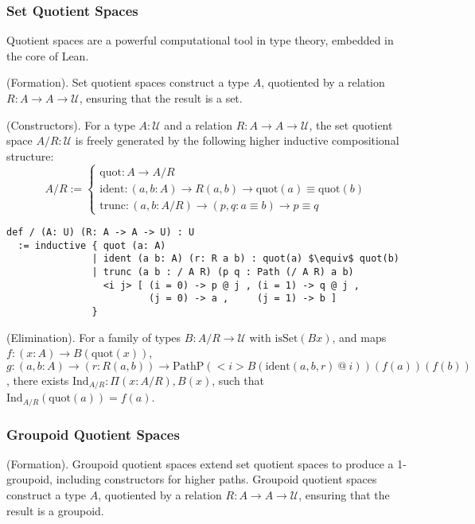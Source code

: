 \subsubsection*{Set Quotient Spaces}
Quotient spaces are a powerful computational tool in type theory, embedded
in the core of Lean.
\begin{definition} (Formation).
Set quotient spaces construct a type \( A \), quotiented by
a relation \( R : A \to A \to \mathcal{U} \), ensuring that the result is a set.
\end{definition}

\begin{definition} (Constructors).
For a type \( A : \mathcal{U} \) and a relation \( R : A \to A \to \mathcal{U} \),
the set quotient space \( A / R : \mathcal{U} \) is freely generated by the following
higher inductive compositional structure:
\[
A / R :=
\begin{cases}
\text{quot} : A \to A / R \\
\text{ident} : (a, b : A) \to R(a,b) \to \text{quot}(a) \equiv \text{quot}(b) \\
\text{trunc} : (a, b : A / R) \to (p, q : a \equiv b) \to p \equiv q
\end{cases}
\]
\begin{lstlisting}[mathescape=true]
def / (A: U) (R: A -> A -> U) : U
  := inductive { quot (a: A)
               | ident (a b: A) (r: R a b) : quot(a) $\equiv$ quot(b)
               | trunc (a b : / A R) (p q : Path (/ A R) a b)
                 <i j> [ (i = 0) -> p @ j , (i = 1) -> q @ j ,
                         (j = 0) -> a ,     (j = 1) -> b ]
               }
\end{lstlisting}
\end{definition}

\begin{theorem} (Elimination).
For a family of types \( B : A/R \to \mathcal{U} \) with \( \text{isSet}(B x) \),
and maps \( f : (x : A) \to B(\text{quot}(x)) \),
\( g : (a, b : A) \to (r : R(a,b)) \to \text{PathP} (<i> B(\text{ident}(a,b,r)\ @\ i)) (f(a)) (f(b)) \),
there exists \( \text{Ind}_{A/R} : \Pi (x: A/R), B(x) \), such that \( \text{Ind}_{A/R}(\text{quot}(a)) = f(a) \).
\end{theorem}

\subsubsection*{Groupoid Quotient Spaces}
\begin{definition} (Formation).
Groupoid quotient spaces extend set quotient spaces to produce a 1-groupoid,
including constructors for higher paths. Groupoid quotient spaces
construct a type \( A \), quotiented by a relation \( R : A \to A \to \mathcal{U} \),
ensuring that the result is a groupoid.
\end{definition}


